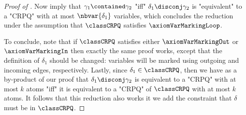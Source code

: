 \begin{proof}[Proof of ]
	Now  imply that
	$\gamma_1 \contained \gamma_2$ "iff" $\delta_1 \disconj \gamma_2$ is "equivalent" to a "CRPQ"
	with at most $\nbvar{\delta_1}$ variables, which concludes the reduction under the assumption
	that $\classCRPQ$ satisfies $\axiomVarMarkingLoop$.

	To conclude, note that
	if $\classCRPQ$ satisfies either $\axiomVarMarkingOut$ or $\axiomVarMarkingIn$ then exactly the same proof works, except that the definition of $\delta_1$
	should be changed: variables will be marked using outgoing and incoming edges, respectively.
	Lastly, since $\delta_1 \in \classCRPQ$, then we have as a by-product of our proof
	that $\delta_1 \disconj \gamma_2$ is equivalent to a "CRPQ" with at most $k$ atoms
	"iff" it is equivalent to a "CRPQ" of $\classCRPQ$ with at most $k$ atoms.
	It follows that this reduction also works it we add the constraint that
	$\delta$ must be in $\classCRPQ$.
\end{proof}